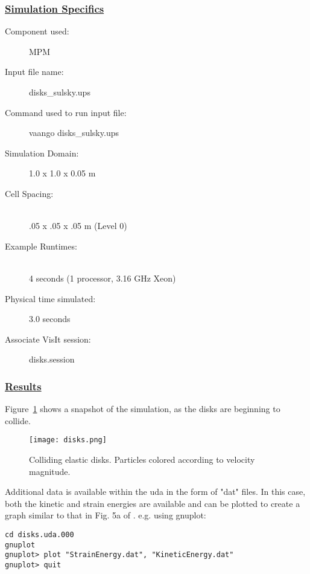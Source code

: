 \subsubsection*{\underline{Simulation Specifics}}
\begin{description} 
\item [Component used:] \hfill MPM
\item [Input file name:] \hfill disks\_sulsky.ups
\item [Command used to run input file:]\hfill vaango disks\_sulsky.ups
\item [Simulation Domain:]\hfill    1.0 x 1.0 x 0.05 m

\item [Cell Spacing:]\hfill \\ 
.05 x .05 x .05 m (Level 0)

\item [Example Runtimes:] \hfill \\
 4 seconds  (1 processor, 3.16 GHz Xeon)\\

\item [Physical time simulated:] \hfill 3.0 seconds

\item [Associate VisIt session:] \hfill disks.session

\end{description}

\subsubsection*{\underline{Results}}

Figure~\ref{figdisks} shows a snapshot of the simulation, as the disks
are beginning to collide.
\begin{figure}
  \center
  \texttt{[image: disks.png]}
  \caption{Colliding elastic disks.  Particles colored according to
velocity magnitude.}
  \label{figdisks}
\end{figure}

Additional data is available within the uda in the form of "dat" files.
In this case, both the kinetic and strain energies are available and can
be plotted to create a graph similar to that in Fig. 5a of \cite{Sulsky1994}.
e.g. using gnuplot:

\begin{lstlisting}[backgroundcolor=\color{background}]
cd disks.uda.000
gnuplot
gnuplot> plot "StrainEnergy.dat", "KineticEnergy.dat"
gnuplot> quit
\end{lstlisting}
%
\newpage

